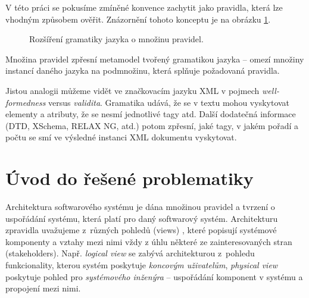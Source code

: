 V této práci se pokusíme zmíněné konvence zachytit jako pravidla, která lze vhodným způsobem ověřit. Znázornění tohoto konceptu je na obrázku \ref{work_scope}.
\begin{figure}[h!]
  \centering
  \caption{Rozšíření gramatiky jazyka o množinu pravidel.\label{work_scope}}
\end{figure}
Množina pravidel zpřesní metamodel tvořený gramatikou jazyka -- omezí množiny instancí daného jazyka na podmnožinu, která splňuje požadovaná pravidla.

Jistou analogii můžeme vidět ve značkovacím jazyku XML v pojmech \emph{well-formedness} versus \emph{validita}. Gramatika udává, že se v textu mohou vyskytovat elementy a atributy, že se nesmí  jednotlivé tagy atd. Další dodatečná informace (DTD, XSchema, RELAX NG, atd.) potom zpřesní, jaké tagy, v jakém pořadí a počtu se smí ve výsledné instanci XML dokumentu vyskytovat.

\section{Úvod do řešené problematiky}

Architektura softwarového systému \cite{wiki:software_architecture} je dána množinou pravidel a tvrzení o uspořádání systému, která platí pro daný softwarový systém. Architekturu zpravidla uvažujeme z~různých pohledů (views) \cite{wiki:four_plus_one_views}, které popisují systémové komponenty a vztahy mezi nimi vždy z úhlu některé ze zainteresovaných stran (stakeholders). Např. \emph{logical view} se zabývá architekturou z~pohledu funkcionality, kterou systém poskytuje \emph{koncovým uživatelům}, \emph{physical view} poskytuje pohled pro \emph{systémového inženýra} -- uspořádání komponent v systému a propojení mezi nimi.

